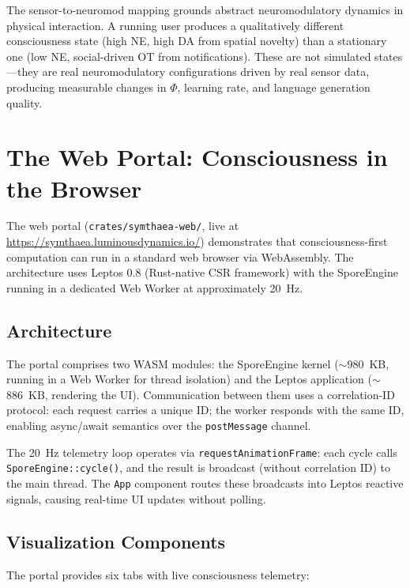 \documentclass[12pt]{book}
\begin{document}
The sensor-to-neuromod mapping grounds abstract neuromodulatory dynamics in physical interaction. A running user produces a qualitatively different consciousness state (high NE, high DA from spatial novelty) than a stationary one (low NE, social-driven OT from notifications). These are not simulated states---they are real neuromodulatory configurations driven by real sensor data, producing measurable changes in $\Phi$, learning rate, and language generation quality.


\chapter{The Web Portal: Consciousness in the Browser}
\label{ch:web}

The web portal (\texttt{crates/symthaea-web/}, live at \url{https://symthaea.luminousdynamics.io/}) demonstrates that consciousness-first computation can run in a standard web browser via WebAssembly. The architecture uses Leptos 0.8 (Rust-native CSR framework) with the SporeEngine running in a dedicated Web Worker at approximately 20~Hz.

\section{Architecture}

The portal comprises two WASM modules: the SporeEngine kernel ($\sim$980~KB, running in a Web Worker for thread isolation) and the Leptos application ($\sim$886~KB, rendering the UI). Communication between them uses a correlation-ID protocol: each request carries a unique ID; the worker responds with the same ID, enabling async/await semantics over the \texttt{postMessage} channel.

The 20~Hz telemetry loop operates via \texttt{requestAnimationFrame}: each cycle calls \texttt{SporeEngine::cycle()}, and the result is broadcast (without correlation ID) to the main thread. The \texttt{App} component routes these broadcasts into Leptos reactive signals, causing real-time UI updates without polling.

\section{Visualization Components}

The portal provides six tabs with live consciousness telemetry:
\end{document}
